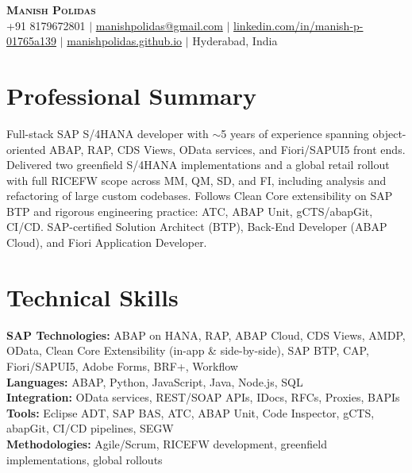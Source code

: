 \documentclass[letterpaper,11pt]{article}
\begin{document}
\begin{center}
    \textbf{\Huge \scshape Manish Polidas} \\ \vspace{1pt}
    \small +91 8179672801 $|$ \href{mailto:manishpolidas@gmail.com}{manishpolidas@gmail.com} $|$
    \href{https://www.linkedin.com/in/manish-p-01765a139/}{linkedin.com/in/manish-p-01765a139} $|$
    \href{https://manishpolidas.github.io}{manishpolidas.github.io} $|$ Hyderabad, India
\end{center}

\section{Professional Summary}
Full-stack SAP S/4HANA developer with $\sim$5 years of experience spanning object-oriented ABAP, RAP, CDS Views, OData services, and Fiori/SAPUI5 front ends. Delivered two greenfield S/4HANA implementations and a global retail rollout with full RICEFW scope across MM, QM, SD, and FI, including analysis and refactoring of large custom codebases. Follows Clean Core extensibility on SAP BTP and rigorous engineering practice: ATC, ABAP Unit, gCTS/abapGit, CI/CD. SAP-certified Solution Architect (BTP), Back-End Developer (ABAP Cloud), and Fiori Application Developer.

\section{Technical Skills}
 \begin{itemize}[leftmargin=0.15in, label={}]
    \small{\item{
     \textbf{SAP Technologies:} ABAP on HANA, RAP, ABAP Cloud, CDS Views, AMDP, OData, Clean Core Extensibility (in-app \& side-by-side), SAP BTP, CAP, Fiori/SAPUI5, Adobe Forms, BRF+, Workflow \\
     \textbf{Languages:} ABAP, Python, JavaScript, Java, Node.js, SQL \\
     \textbf{Integration:} OData services, REST/SOAP APIs, IDocs, RFCs, Proxies, BAPIs \\
     \textbf{Tools:} Eclipse ADT, SAP BAS, ATC, ABAP Unit, Code Inspector, gCTS, abapGit, CI/CD pipelines, SEGW \\
     \textbf{Methodologies:} Agile/Scrum, RICEFW development, greenfield implementations, global rollouts \\
    }}
 \end{itemize}
\end{document}
